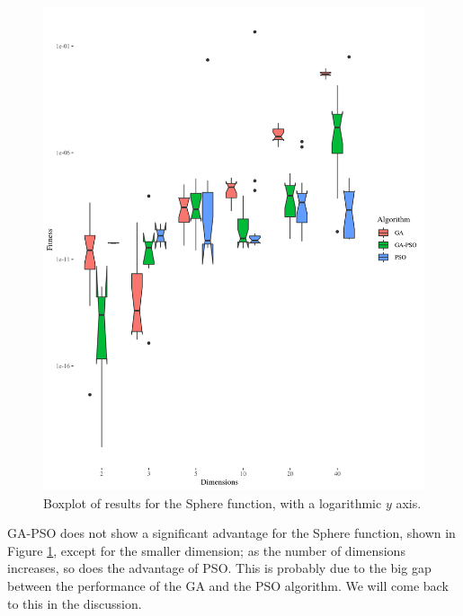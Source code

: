\documentclass[runningheads]{llncs}
\begin{document}
\begin{figure}[h!tb]
  \centering
  \includegraphics[height=0.44\textheight]{img/sphere-boxplot.png}
  \caption{Boxplot of results for the Sphere function, with a logarithmic $y$ axis.\label{fig:boxplot:sphere}}
\end{figure}
%
GA-PSO does not show a significant advantage for the Sphere
function, shown in Figure \ref{fig:boxplot:sphere}, except for the
smaller dimension; as the number of dimensions increases, so does the
advantage of PSO. This is probably due to the big gap between the
performance of the GA and the PSO algorithm. We will come back to this
in the discussion.
\end{document}
